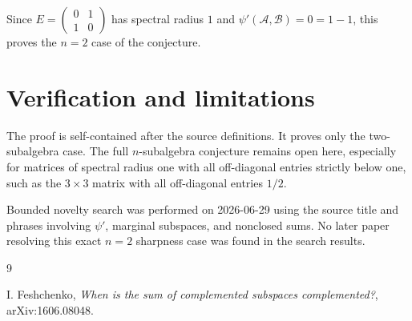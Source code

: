 \documentclass[11pt]{amsart}
\newcommand{\A}{\mathcal A}
\newcommand{\B}{\mathcal B}
\newcommand{\psip}{\psi'}
\begin{document}
Since \(E=\left(\begin{smallmatrix}0&1\\1&0\end{smallmatrix}\right)\) has
spectral radius \(1\) and \(\psip(\A,\B)=0=1-1\), this proves the \(n=2\)
case of the conjecture.

\section*{Verification and limitations}

The proof is self-contained after the source definitions.  It proves only the
two-subalgebra case.  The full \(n\)-subalgebra conjecture remains open here,
especially for matrices of spectral radius one with all off-diagonal entries
strictly below one, such as the \(3\times3\) matrix with all off-diagonal
entries \(1/2\).

Bounded novelty search was performed on 2026-06-29 using the source title and
phrases involving \(\psip\), marginal subspaces, and nonclosed sums.  No later
paper resolving this exact \(n=2\) sharpness case was found in the search
results.

\begin{thebibliography}{9}

I. Feshchenko,
\emph{When is the sum of complemented subspaces complemented?},
arXiv:1606.08048.

\end{thebibliography}
\end{document}
